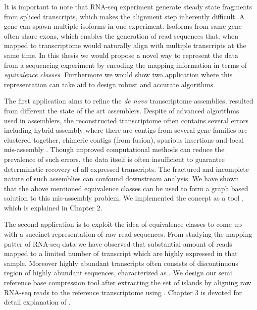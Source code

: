It is important to note that RNA-seq experiment generate steady state fragments from spliced transcripts, which makes the alignment step inherently difficult. A gene can spawn multiple isoforms in one experiment. Isoforms from same gene often share exons, which enables the generation of read sequences that, when mapped to transcriptome would naturally align with multiple transcripts at the same time. In this thesis we would propose a novel way to represent the data from a sequencing experiment by encoding the mapping information in terms of {\it equivalence classes}. Furthermore we would show two application where this representation can take aid to design robust and accurate algorithms. 

The first application aims to refine the {\it de novo} transcriptome assemblies, resulted from different the state of the art assemblers. Despite of advanced algorithms used in assemblers, the reconstructed transcriptome often contains several errors including hybrid assembly where there are contigs from several gene families are clustered together, chimeric contigs (from fusion), spurious insertions and local mis-assembly \citep{transrate}. Though improved computational methods can reduce the prevalence of such errors, the data itself is often insufficient to guarantee deterministic recovery of all expressed transcripts.  The fractured and incomplete nature of such \denovo assemblies can confound downstream analysis. We have shown that the above mentioned equivalence classes can be used to form a graph based solution to this mis-assembly problem. We implemented the concept as a tool \rapclust, which is explained in Chapter 2.

The second application is to exploit the idea of equivalence classes to come up with a succinct representation of raw read sequences. From studying the mapping patter of RNA-seq data we have observed that substantial amount of reads mapped to a limited number of transcript which are highly expressed in that sample. Moreover highly abundant transcripts often consists of discontinuous region of highly abundant sequences, characterized as \islands. We design our semi reference base compression tool \quark after extracting the set of islands by aligning raw RNA-seq reads to the reference transcriptome using \rapmap. Chapter 3 is devoted for detail explanation of \quark. 







